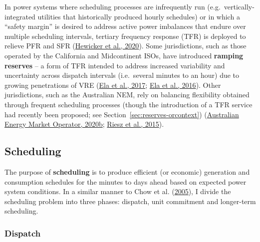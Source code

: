 \documentclass[12pt,a4paper,]{report}
\begin{document}
In power systems where scheduling processes are infrequently run
(e.g.~vertically-integrated utilities that historically produced hourly
schedules) or in which a ``safety margin'' is desired to address active
power imbalances that endure over multiple scheduling intervals,
tertiary frequency response (TFR) is deployed to relieve PFR and SFR
(\protect\hyperlink{ref-hewickerDimensioningControlReserves2020}{Hewicker
et al., 2020}). Some jurisdictions, such as those operated by the
California and Midcontinent ISOs, have introduced \textbf{ramping
reserves} -- a form of TFR intended to address increased variability and
uncertainty across dispatch intervals (i.e.~several minutes to an hour)
due to growing penetrations of VRE
(\protect\hyperlink{ref-elaElectricityMarketsRenewables2017}{Ela et al.,
2017}; \protect\hyperlink{ref-elaWholesaleElectricityMarket2016}{Ela et
al., 2016}). Other jurisdictions, such as the Australian NEM, rely on
balancing flexibility obtained through frequent scheduling processes
(though the introduction of a TFR service had recently been proposed;
see Section~\ref{sec:reserves-orcontext})
(\protect\hyperlink{ref-australianenergymarketoperatorPowerSystemRequirements2020}{Australian
Energy Market Operator, 2020b};
\protect\hyperlink{ref-rieszFrequencyControlAncillary2015}{Riesz et al.,
2015}).

\hypertarget{sec:lit_review-balancing_practices-scheduling}{%
\subsection{Scheduling}\label{sec:lit_review-balancing_practices-scheduling}}

The purpose of \textbf{scheduling} is to produce efficient (or economic)
generation and consumption schedules for the minutes to days ahead based
on expected power system conditions. In a similar manner to Chow et al.
(\protect\hyperlink{ref-chowElectricityMarketDesign2005}{2005}), I
divide the scheduling problem into three phases: dispatch, unit
commitment and longer-term scheduling.

\hypertarget{dispatch}{%
\subsubsection{Dispatch}\label{dispatch}}
\end{document}
